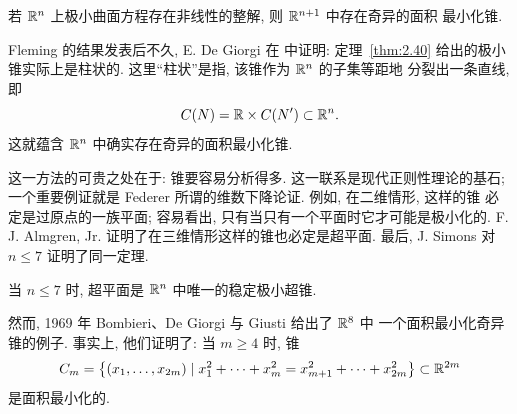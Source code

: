 \begin{theorem}
\label{thm:2.40}
若 $\mathbb{R}^n$ 上极小曲面方程存在非线性的整解, 则 $\mathbb{R}^{n+1}$ 中存在奇异的面积
最小化锥.
\end{theorem}

Fleming 的结果发表后不久, E. De Giorgi 在 \cite{DG} 中证明: 定理~\ref{thm:2.40}
给出的极小锥实际上是柱状的. 这里``柱状''是指, 该锥作为 $\mathbb{R}^n$ 的子集等距地
分裂出一条直线, 即
\begin{equation}
C(N)=\mathbb{R}\times C(N')\subset\mathbb{R}^n.
\label{eq:2.182}
\end{equation}
这就蕴含 $\mathbb{R}^n$ 中确实存在奇异的面积最小化锥.

这一方法的可贵之处在于: 锥要容易分析得多. 这一联系是现代正则性理论的基石;
一个重要例证就是 Federer 所谓的维数下降论证. 例如, 在二维情形, 这样的锥
必定是过原点的一族平面; 容易看出, 只有当只有一个平面时它才可能是极小化的.
F. J. Almgren, Jr. 证明了在三维情形这样的锥也必定是超平面. 最后, J. Simons
对 $n\leq7$ 证明了同一定理.

\begin{theorem}[F. J. Almgren, Jr. \cite{Am1}(当 $n=3$), J. Simons \cite{Sim}
(当 $n\leq7$)]
\label{thm:2.41}
当 $n\leq7$ 时, 超平面是 $\mathbb{R}^n$ 中唯一的稳定极小超锥.
\end{theorem}

然而, 1969 年 Bombieri、De Giorgi 与 Giusti \cite{BDGG} 给出了 $\mathbb{R}^8$ 中
一个面积最小化奇异锥的例子. 事实上, 他们证明了: 当 $m\geq4$ 时, 锥
\begin{equation}
C_m=\bigl\{(x_1,\dots,x_{2m})\mid x_1^{2}+\cdots+x_m^{2}
 =x_{m+1}^{2}+\cdots+x_{2m}^{2}\bigr\}\subset\mathbb{R}^{2m}
\label{eq:2.183}
\end{equation}
是面积最小化的.
